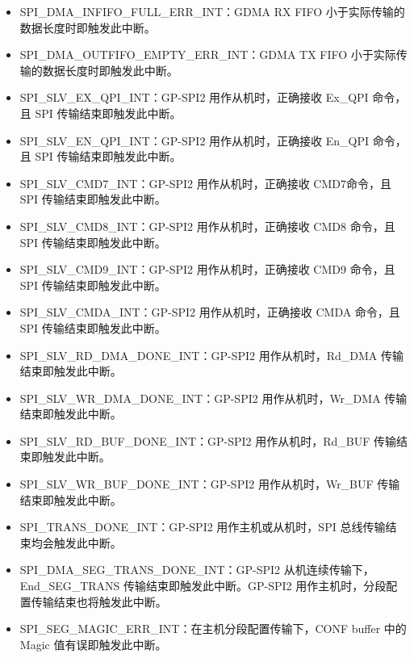 \documentclass[main\_\_CN.tex]{subfiles}
\begin{document}
\begin{itemize}
\item \label{int:SPIINFIFOFULLERRINT}SPI\_DMA\_INFIFO\_FULL\_ERR\_INT：GDMA RX FIFO 小于实际传输的数据长度时即触发此中断。
\item \label{int:SPIOUTFIFOEMPTYERRINT}SPI\_DMA\_OUTFIFO\_EMPTY\_ERR\_INT：GDMA TX FIFO 小于实际传输的数据长度时即触发此中断。   

\item \label{int:SPISLVEXQPIINT} SPI\_SLV\_EX\_QPI\_INT：GP-SPI2 用作从机时，正确接收 Ex\_QPI 命令，且 SPI 传输结束即触发此中断。
\item \label{int:SPISLVENQPIINT} SPI\_SLV\_EN\_QPI\_INT：GP-SPI2 用作从机时，正确接收 En\_QPI 命令，且 SPI 传输结束即触发此中断。
\item \label{int:SPISLVCMD7INT} SPI\_SLV\_CMD7\_INT：GP-SPI2 用作从机时，正确接收 CMD7命令，且 SPI 传输结束即触发此中断。
\item \label{int:SPISLVCMD8INT} SPI\_SLV\_CMD8\_INT：GP-SPI2 用作从机时，正确接收 CMD8 命令，且 SPI 传输结束即触发此中断。
\item \label{int:SPISLVCMD9INT} SPI\_SLV\_CMD9\_INT：GP-SPI2 用作从机时，正确接收 CMD9 命令，且 SPI 传输结束即触发此中断。
\item \label{int:SPISLVCMDAINT} SPI\_SLV\_CMDA\_INT：GP-SPI2 用作从机时，正确接收 CMDA 命令，且 SPI 传输结束即触发此中断。

\item \label{int:SPISLVRDDMADONEINT}SPI\_SLV\_RD\_DMA\_DONE\_INT：GP-SPI2 用作从机时，Rd\_DMA 传输结束即触发此中断。
\item \label{int:SPISLVWRDMADONEINT}SPI\_SLV\_WR\_DMA\_DONE\_INT：GP-SPI2 用作从机时，Wr\_DMA 传输结束即触发此中断。
\item \label{int:SPISLVRDBUFDONEINT}SPI\_SLV\_RD\_BUF\_DONE\_INT：GP-SPI2 用作从机时，Rd\_BUF 传输结束即触发此中断。
\item \label{int:SPISLVWRBUFDONEINT}SPI\_SLV\_WR\_BUF\_DONE\_INT：GP-SPI2 用作从机时，Wr\_BUF 传输结束即触发此中断。

\item \label{int:SPITRANSDONEINT}SPI\_TRANS\_DONE\_INT：GP-SPI2 用作主机或从机时，SPI 总线传输结束均会触发此中断。 
\item \label{int:SPIDMASEGTRANSDONEINT}SPI\_DMA\_SEG\_TRANS\_DONE\_INT：GP-SPI2 从机连续传输下，End\_SEG\_TRANS 传输结束即触发此中断。GP-SPI2 用作主机时，分段配置传输结束也将触发此中断。
\item \label{int:SPISEGMAGICERRINT} SPI\_SEG\_MAGIC\_ERR\_INT：在主机分段配置传输下，CONF buffer 中的 Magic 值有误即触发此中断。


\end{itemize}
\end{document}
